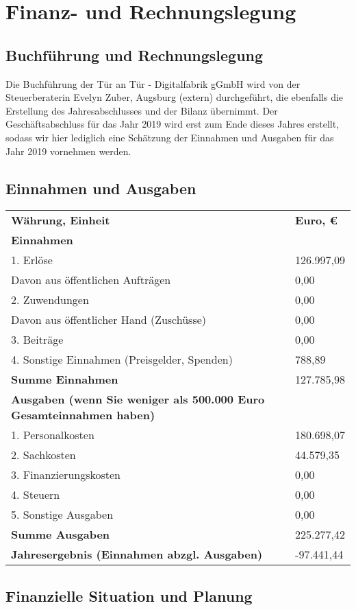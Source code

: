 \documentclass[12pt, a4paper]{article} %
\begin{document}
\hypertarget{finanz--und-rechnungslegung}{%
\section{Finanz- und
Rechnungslegung}\label{finanz--und-rechnungslegung}}

\hypertarget{buchfuxfchrung-und-rechnungslegung}{%
\subsection{Buchführung und
Rechnungslegung}\label{buchfuxfchrung-und-rechnungslegung}}

Die Buchführung der Tür an Tür - Digitalfabrik gGmbH wird von der
Steuerberaterin Evelyn Zuber, Augsburg (extern) durchgeführt, die
ebenfalls die Erstellung des Jahresabschlusses und der Bilanz übernimmt.
Der Geschäftsabschluss für das Jahr 2019 wird erst zum Ende dieses
Jahres erstellt, sodass wir hier lediglich eine Schätzung der Einnahmen
und Ausgaben für das Jahr 2019 vornehmen werden.

\hypertarget{einnahmen-und-ausgaben}{%
\subsection{Einnahmen und Ausgaben}\label{einnahmen-und-ausgaben}}

\begin{longtable}[]{@{}ll@{}}
\toprule
\endhead
\textbf{Währung, Einheit} & \textbf{Euro, €}\tabularnewline
\textbf{Einnahmen} &\tabularnewline
1. Erlöse & 126.997,09\tabularnewline
Davon aus öffentlichen Aufträgen & 0,00\tabularnewline
2. Zuwendungen & 0,00\tabularnewline
Davon aus öffentlicher Hand (Zuschüsse) & 0,00\tabularnewline
3. Beiträge & 0,00\tabularnewline
4. Sonstige Einnahmen (Preisgelder, Spenden) & 788,89\tabularnewline
\textbf{Summe Einnahmen} & 127.785,98\tabularnewline
\textbf{Ausgaben (wenn Sie weniger als 500.000 Euro Gesamteinnahmen
haben)} &\tabularnewline
1. Personalkosten & 180.698,07\tabularnewline
2. Sachkosten & 44.579,35\tabularnewline
3. Finanzierungskosten & 0,00\tabularnewline
4. Steuern & 0,00\tabularnewline
5. Sonstige Ausgaben & 0,00\tabularnewline
\textbf{Summe Ausgaben} & 225.277,42\tabularnewline
\textbf{Jahresergebnis (Einnahmen abzgl. Ausgaben)} &
-97.441,44\tabularnewline
\bottomrule
\end{longtable}

\hypertarget{finanzielle-situation-und-planung}{%
\subsection{Finanzielle Situation und
Planung}\label{finanzielle-situation-und-planung}}
\end{document}
